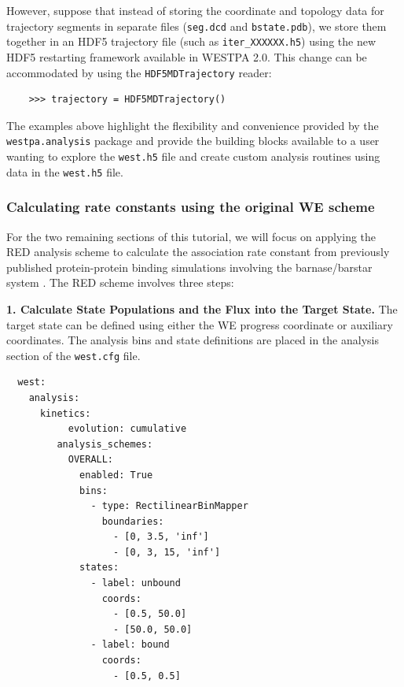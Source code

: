 However, suppose that instead of storing the coordinate and topology data for trajectory segments in separate files (\verb|seg.dcd| and \verb|bstate.pdb|), we store them together in an HDF5 trajectory file (such as \verb|iter_XXXXXX.h5|) using the new HDF5 restarting framework available in WESTPA 2.0. This change can be accommodated by using the \verb|HDF5MDTrajectory| reader:

\begin{verbatim}
    >>> trajectory = HDF5MDTrajectory()
\end{verbatim}

The examples above highlight the flexibility and convenience provided by the \verb|westpa.analysis| package and provide the building blocks available to a user wanting to explore the \verb|west.h5| file and create custom analysis routines using data in the \verb|west.h5| file.

\subsubsection{Calculating rate constants using the original WE scheme}

For the two remaining sections of this tutorial, we will focus on applying the RED analysis scheme \citep{degrave_red_2021} to calculate the association rate constant from previously published protein-protein binding simulations involving the barnase/barstar system \citep{saglam_proteinprotein_2019}.
The RED scheme involves three steps:\linebreak

\textbf{1. Calculate State Populations and the Flux into the Target State.} The target state can be defined using either the WE progress coordinate or auxiliary coordinates.
The analysis bins and state definitions are placed in the analysis section of the \verb|west.cfg| file.

\begin{verbatim}
  west:
    analysis:
      kinetics:
           evolution: cumulative
         analysis_schemes:                  
           OVERALL:
             enabled: True
             bins:
               - type: RectilinearBinMapper
                 boundaries:
                   - [0, 3.5, 'inf']  
                   - [0, 3, 15, 'inf']
             states:
               - label: unbound
                 coords:
                   - [0.5, 50.0]
                   - [50.0, 50.0]
               - label: bound
                 coords: 
                   - [0.5, 0.5]
\end{verbatim}


